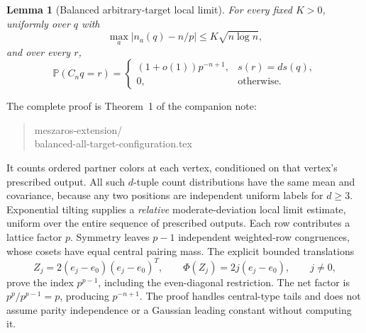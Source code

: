 \documentclass[11pt]{article}
\newtheorem{lemma}{Lemma}
\newcommand{\Prob}{\mathbb P}
\begin{document}
\begin{lemma}[Balanced arbitrary-target local limit]\label{lem:central}
For every fixed $K>0$, uniformly over $q$ with
\[
 \max_a|n_a(q)-n/p|\le K\sqrt{n\log n},
\]
and over every $r$,
\[
 \Prob(C_nq=r)=
 \begin{cases}
 (1+o(1))p^{-n+1},&s(r)=ds(q),\\
 0,&\text{otherwise}.
 \end{cases}
\]
\end{lemma}
The complete proof is Theorem~1 of the companion note:
\begin{quote}\small\ttfamily
meszaros-extension/\\
balanced-all-target-configuration.tex
\end{quote}
It counts ordered partner colors at each vertex, conditioned on that
vertex's prescribed output. All such $d$-tuple count distributions
have the same mean and covariance, because any two positions are
independent uniform labels for $d\ge3$. Exponential tilting supplies
a \emph{relative} moderate-deviation local limit estimate, uniform
over the entire sequence of prescribed outputs.
Each row contributes a lattice factor $p$. Symmetry leaves $p-1$
independent weighted-row congruences, whose cosets have equal central
pairing mass. The explicit bounded translations
\[
 Z_j=2(e_j-e_0)(e_j-e_0)^T,
 \qquad \Phi(Z_j)=2j(e_j-e_0),\qquad j\ne0,
\]
prove the index $p^{p-1}$, including the even-diagonal restriction.
The net factor is $p^p/p^{p-1}=p$, producing $p^{-n+1}$.
The proof handles central-type tails and does not assume parity
independence or a Gaussian leading constant without computing it.
\end{document}

